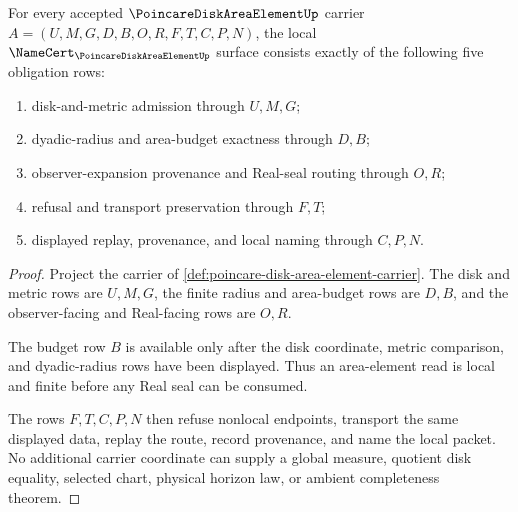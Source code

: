 \begin{theorem}
\label{thm:poincare-disk-area-element-namecert-obligations}
For every accepted $\PoincareDiskAreaElementUp$ carrier $A=(U,M,G,D,B,O,R,F,T,C,P,N)$, the local $\NameCert_{\PoincareDiskAreaElementUp}$ surface consists exactly of the following five obligation rows:
\begin{enumerate}
\item disk-and-metric admission through $U,M,G$;
\item dyadic-radius and area-budget exactness through $D,B$;
\item observer-expansion provenance and Real-seal routing through $O,R$;
\item refusal and transport preservation through $F,T$;
\item displayed replay, provenance, and local naming through $C,P,N$.
\end{enumerate}
\end{theorem}
\begin{proof}
Project the carrier of \autoref{def:poincare-disk-area-element-carrier}. The disk and metric rows are $U,M,G$, the finite radius and area-budget rows are $D,B$, and the observer-facing and Real-facing rows are $O,R$.

The budget row $B$ is available only after the disk coordinate, metric comparison, and dyadic-radius rows have been displayed. Thus an area-element read is local and finite before any Real seal can be consumed.

The rows $F,T,C,P,N$ then refuse nonlocal endpoints, transport the same displayed data, replay the route, record provenance, and name the local packet. No additional carrier coordinate can supply a global measure, quotient disk equality, selected chart, physical horizon law, or ambient completeness theorem.
\end{proof}



